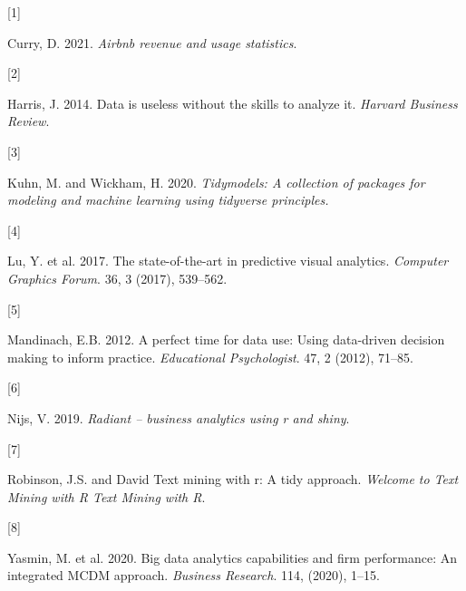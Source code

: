 \documentclass{acm_proc_article-sp}
\newlength{\csllabelwidth}
\newlength{\cslhangindent}
\newenvironment{CSLReferences}[3] %
 {%
  \setlength{\parindent}{0pt}
  \ifodd #1 \everypar{\setlength{\hangindent}{\cslhangindent}}\ignorespaces\fi
  \ifnum #2 > 0
  \setlength{\parskip}{#2\baselineskip}
  \fi
 }%
 {}
\newcommand{\CSLLeftMargin}[1]{\parbox[t]{\csllabelwidth}{#1}}
\newcommand{\CSLRightInline}[1]{\parbox[t]{\linewidth - \csllabelwidth}{#1}}
\begin{document}
\hypertarget{refs}{}
\begin{CSLReferences}{0}{0}
\leavevmode{}%
\CSLLeftMargin{{[}1{]} }
\CSLRightInline{Curry, D. 2021. \emph{Airbnb revenue and usage
statistics}.}

\leavevmode{}%
\CSLLeftMargin{{[}2{]} }
\CSLRightInline{Harris, J. 2014. Data is useless without the skills to
analyze it. \emph{Harvard Business Review}.}

\leavevmode{}%
\CSLLeftMargin{{[}3{]} }
\CSLRightInline{Kuhn, M. and Wickham, H. 2020. \emph{Tidymodels: A
collection of packages for modeling and machine learning using tidyverse
principles.}}

\leavevmode{}%
\CSLLeftMargin{{[}4{]} }
\CSLRightInline{Lu, Y. et al. 2017. The state-of-the-art in predictive
visual analytics. \emph{Computer Graphics Forum}. 36, 3 (2017),
539--562.}

\leavevmode{}%
\CSLLeftMargin{{[}5{]} }
\CSLRightInline{Mandinach, E.B. 2012. A perfect time for data use: Using
data-driven decision making to inform practice. \emph{Educational
Psychologist}. 47, 2 (2012), 71--85.}

\leavevmode{}%
\CSLLeftMargin{{[}6{]} }
\CSLRightInline{Nijs, V. 2019. \emph{Radiant -- business analytics using
r and shiny}.}

\leavevmode{}%
\CSLLeftMargin{{[}7{]} }
\CSLRightInline{Robinson, J.S. and David Text mining with r: A tidy
approach. \emph{Welcome to Text Mining with R \textbar{} Text Mining
with R}.}

\leavevmode{}%
\CSLLeftMargin{{[}8{]} }
\CSLRightInline{Yasmin, M. et al. 2020. Big data analytics capabilities
and firm performance: An integrated MCDM approach. \emph{Business
Research}. 114, (2020), 1--15.}

\end{CSLReferences}
\setlength{\parindent}{0in}
\end{document}
